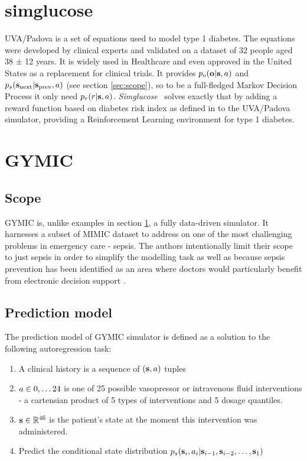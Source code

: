 \section{simglucose}
\label{sec:simglucose}

UVA/Padova \cite{manUVAPADOVAType2014} is a set of equations used to model type 1 diabetes.
The equations were developed by clinical experts and validated on a dataset of 32 people aged 38 ± 12 years.
It is widely used in Healthcare and even approved in the United States as a replacement for clinical trials.
It provides $p_o(\mathbf{o} | \textbf{s}, a)$ and $p_s(\textbf{s}_\text{next} | \textbf{s}_\text{prev}, a)$ (see section \ref{sec:scope}), so to be a full-fledged Markov Decision Process it only need $p_r(r|\textbf{s},a)$.
\emph{Simglucose}~\cite{simglucose} solves exactly that by adding a reward function based on diabetes risk index as defined in \cite{diabetesrisk} to the UVA/Padova simulator, providing a Reinforcement Learning environment for type 1 diabetes.

\newpage
\section{GYMIC}
\label{sec:gymic}

\subsection{Scope}
GYMIC \cite{gym-sepsis} is, unlike examples in section \ref{sec:simglucose}, a fully data-driven simulator.
It harnesses a subset of MIMIC \cite{johnsonMIMICIVFreelyAccessible2023} dataset to address on one of the most challenging problems in emergency care - sepsis.
The authors intentionally limit their scope to just sepsis in order to simplify the modelling task as well as because sepsis prevention has been identified as an area where doctors would particularly benefit from electronic decision support \cite{sepsis-motivation1,sepsis-motivation2}.

\subsection{Prediction model}
The prediction model of GYMIC simulator is defined as a solution to the following autoregression task:
\begin{enumerate}
    \item A clinical history is a sequence of $(\textbf{s}, a)$ tuples
    \item $a \in 0,\dots 24$ is one of 25 possible vasopressor or intravenous fluid interventions - a cartensian product of 5 types of interventions and 5 dosage quantiles.
    \item $\textbf{s} \in \mathbb{R}^{46}$ is the patient's state at the moment this intervention was administered.
    \item Predict the conditional state distribution $p_s(\textbf{s}_i, a_i | \textbf{s}_{i-1},\textbf{s}_{i-2},\dots,\textbf{s}_1)$
\end{enumerate}

